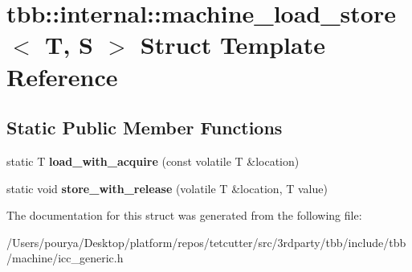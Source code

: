 \hypertarget{structtbb_1_1internal_1_1machine__load__store}{}\section{tbb\+:\+:internal\+:\+:machine\+\_\+load\+\_\+store$<$ T, S $>$ Struct Template Reference}
\label{structtbb_1_1internal_1_1machine__load__store}
\subsection*{Static Public Member Functions}
\begin{DoxyCompactItemize}
\item 
\hypertarget{structtbb_1_1internal_1_1machine__load__store_a92370c736ce03781f953758c32e1f420}{}static T {\bfseries load\+\_\+with\+\_\+acquire} (const volatile T \&location)\label{structtbb_1_1internal_1_1machine__load__store_a92370c736ce03781f953758c32e1f420}

\item 
\hypertarget{structtbb_1_1internal_1_1machine__load__store_a6f04fb93302b58c393d09531dcbea5e9}{}static void {\bfseries store\+\_\+with\+\_\+release} (volatile T \&location, T value)\label{structtbb_1_1internal_1_1machine__load__store_a6f04fb93302b58c393d09531dcbea5e9}

\end{DoxyCompactItemize}


The documentation for this struct was generated from the following file\+:\begin{DoxyCompactItemize}
\item 
/\+Users/pourya/\+Desktop/platform/repos/tetcutter/src/3rdparty/tbb/include/tbb/machine/icc\+\_\+generic.\+h\end{DoxyCompactItemize}
